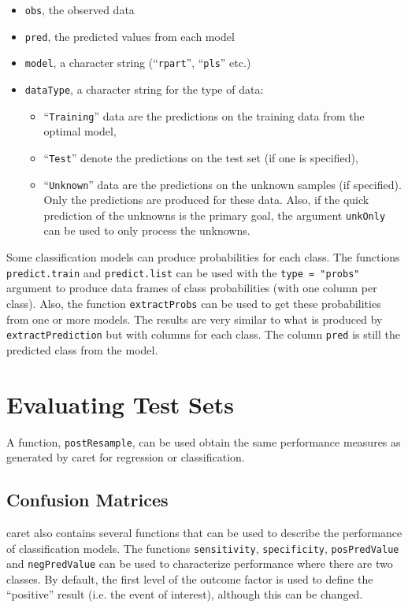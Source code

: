 \documentclass[12pt]{article}
\newcommand{\code}[1]{\mbox{\footnotesize\color{darkblue}\texttt{#1}}}
\newcommand{\pkg}[1]{{\fontseries{b}\selectfont #1}}
\renewcommand{\pkg}[1]{{\textsf{#1}}}
\begin{document}
   \begin{itemize}   
      \item \code{obs}, the observed data
      \item \code{pred}, the predicted values from each model
      \item \code{model}, a character string (``\code{rpart}'', ``\code{pls}'' etc.)
      \item \code{dataType}, a character string for the type of data:
      \begin{itemize}
         \item ``\code{Training}'' data are the predictions on the training data from
            the optimal model,
         \item ``\code{Test}'' denote the predictions on the test set (if one is specified),
         \item ``\code{Unknown}'' data are the predictions on the unknown samples (if specified). 
         Only the predictions are produced for these data. Also, if the quick prediction of the unknowns
         is the primary goal, the argument \code{unkOnly} can be used to only process the unknowns.
      \end{itemize}
   \end{itemize}      

Some classification models can produce probabilities for each
class. The functions \code{predict.train} and \code{predict.list}
can be used with the \code{type = "probs"} argument to produce data
frames of class probabilities (with one column per class). Also, the
function \code{extractProbs} can be used to get these probabilities
from one or more models. The results are very similar to what is
produced by \code{extractPrediction} but with columns for each
class. The column \code{pred} is still the predicted class from the
model.  


\section{Evaluating Test Sets}

A function, \code{postResample}, can be used obtain the same
performance measures as generated by \pkg{caret} for regression or
classification. 

\subsection{Confusion Matrices}\label{S:confusion}

\pkg{caret} also contains several functions that can be used to
describe the performance of classification models. The functions
\code{sensitivity}, \code{specificity}, \code{posPredValue} and
\code{negPredValue} can be used to characterize performance where
there are two classes. By default, the first level of the outcome
factor is used to define the ``positive'' result (i.e. the event of
interest), although this can be changed.  
\end{document}
